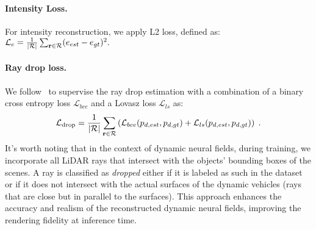 \paragraph{Intensity Loss.}
For intensity reconstruction, we apply L2 loss, defined as: $\mathcal{L}_{e} = \frac{1}{|\mathcal{R}|}\sum_{\mathbf{r} \in \mathcal{R}}(e_{est} -e_{gt})^2.$


\paragraph{Ray drop loss.}
We follow~\cite{Huang2023nfl} to supervise the ray drop estimation with a combination of a binary cross entropy loss $\mathcal{L}_{bce}$ and a Lovasz loss $\mathcal{L}_{ls}$ \cite{berman2018lovasz} as:
\begin{equation}
     \mathcal{L}_{\text{drop}} = \frac{1}{|\mathcal{R}|} \sum_{\mathbf{r} \in \mathcal{R}} \left(\mathcal{L}_{bce}(p_{d, est}, {p_{d, gt}}) + \mathcal{L}_{ls}(p_{d, est}, {p_{d, gt}}) \right)\;.
     \label{eq:raydrop_loss}
\end{equation}
It's worth noting that in the context of dynamic neural fields, during training, we incorporate all LiDAR rays that intersect with the objects' bounding boxes of the scenes. A ray is classified as \textit{dropped} either if it is labeled as such in the dataset or if it does not intersect with the actual surfaces of the dynamic vehicles (\eg rays that are close but in parallel to the surfaces). This approach enhances the accuracy and realism of the reconstructed dynamic neural fields, improving the rendering fidelity at inference time. 





